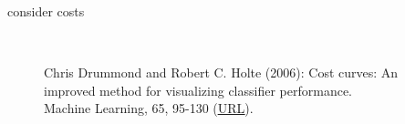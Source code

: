 \begin{vbframe}{consider costs}
\begin{columns}[T]
\begin{column}{0.5\textwidth}
\begin{figure}
  \tiny
  \\Chris Drummond and Robert C. Holte (2006): Cost curves: An improved
  method for visualizing classifier performance. \\Machine Learning, 65, 95-130
  (\href{https://www.semanticscholar.org/paper/Cost-curves\%3A-An-improved-method-for  -visualizing-Drummond-Holte/71708ce984e0896e7383435913547e770572410e}
  {\underline{URL}}).
\end{figure}
\end{column}
\end{columns}
\end{vbframe}



